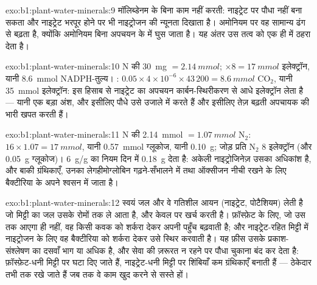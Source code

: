 \begin{solution}{exo:b1:plant-water-minerals:9}
मॉलिब्डेनम के बिना  काम नहीं करती: नाइट्रेट पर
पौधा  नहीं बना सकता और नाइट्रेट भरपूर होने पर भी नाइट्रोजन की
न्यूनता दिखाता है। अमोनियम पर वह सामान्य ढंग से बढ़ता है, क्योंकि अमोनियम
बिना अपचयन के  में घुस जाता है। यह अंतर उस तत्व को एक ही
 में ठहरा देता है।
\end{solution}

\begin{solution}{exo:b1:plant-water-minerals:10}
N की \qty{30}{mg} $= \qty{2.14}{mmol}$; $\times 8 = \qty{17}{mmol}$
इलेक्ट्रॉन, यानी \qty{8.6}{mmol} NADPH-तुल्य। : $0.05\times
4\times 10^{-6}\times 43\,200 = \qty{8.6}{mmol}$ $\mathrm{CO_2}$,
यानी \qty{35}{mmol} इलेक्ट्रॉन: इस हिसाब से नाइट्रेट का अपचयन
कार्बन-स्थिरीकरण से आधे इलेक्ट्रॉन लेता है --- यानी एक बड़ा अंश,
और इसीलिए पौधे उसे उजाले में करते हैं और इसीलिए तेज़ बढ़ती 
अपचायक की भारी खपत करती हैं।
\end{solution}

\begin{solution}{exo:b1:plant-water-minerals:11}
N की \qty{2.14}{mmol} $= \qty{1.07}{mmol}$ $\mathrm{N_2}$: 
$16\times 1.07 = \qty{17}{mmol}$, यानी \qty{0.57}{mmol} ग्लूकोज,
यानी \qty{0.10}{g}; जोड़ प्रति $\mathrm{N_2}$ 8 इलेक्ट्रॉन (और
\qty{0.05}{g} ग्लूकोज)। \qty{6}{g/g} का नियम दिन में \qty{0.18}{g}
देता है: अकेली नाइट्रोजिनेज़ उसका अधिकांश है, और बाकी ग्रंथिकाएँ,
उनका लेगहीमोग्लोबिन गढ़ने-सँभालने में तथा ऑक्सीजन नीची रखने के लिए
बैक्टीरिया के अपने श्वसन में जाता है।
\end{solution}

\begin{solution}{exo:b1:plant-water-minerals:12}
 स्वयं जल और वे गतिशील आयन (नाइट्रेट, पोटैशियम) लेती है
जो मिट्टी का जल उसके रोमों तक ले आता है, और  केवल
 पर खर्च करती है। फ़ॉस्फ़ेट के लिए, जो उस तक आएगा ही नहीं, वह
किसी कवक को शर्करा देकर अपनी पहुँच बढ़वाती है; और नाइट्रेट-रहित मिट्टी में
नाइट्रोजन के लिए वह बैक्टीरिया को शर्करा देकर उसे स्थिर करवाती है। यह
फ़ीस उसके प्रकाश-संश्लेषण का दसवाँ भाग या अधिक है, और सेवा की ज़रूरत न
रहने पर पौधा चुकाना बंद कर देता है: फ़ॉस्फ़ेट-धनी मिट्टी पर  घटा
दिए जाते हैं, नाइट्रेट-धनी मिट्टी पर शिंबियाँ कम ग्रंथिकाएँ बनाती हैं ---
ठेकेदार तभी तक रखे जाते हैं जब तक वे काम खुद करने से सस्ते हों।
\end{solution}


